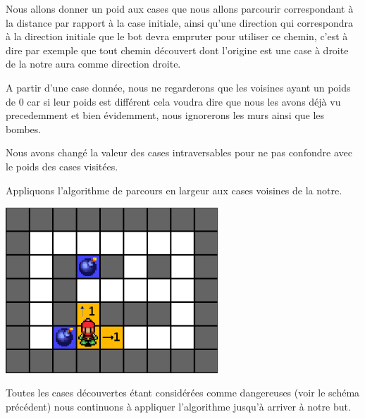 			Nous allons donner un poid aux cases que nous allons parcourir
			correspondant à la distance par rapport à la case initiale, ainsi qu'une
			direction qui correspondra à la direction initiale que le \gls{bot} devra empruter
			pour utiliser ce chemin, c'est à dire par exemple que tout chemin découvert
			dont l'origine est une case à droite de la notre aura comme direction droite.
			
			A partir d'une case donnée, nous ne regarderons que les voisines ayant un poids de 0
			car si leur poids est différent cela voudra dire que nous les avons déjà vu precedemment et bien évidemment,
			nous ignorerons les murs ainsi que les bombes.
			
			Nous avons changé la valeur des cases intraversables pour ne pas confondre avec le poids des cases visitées.			
			
			Appliquons l'algorithme de parcours en largeur aux cases voisines de la notre.
			
			
			\begin{center}
				\includegraphics[width=8cm]{./Analyse/Img/largeur_2.eps}
			\end{center}
			
			
			Toutes les cases découvertes étant considérées comme dangereuses (voir le schéma précédent) nous continuons à appliquer l'\gls{algorithme} jusqu'à arriver à notre but.
			

